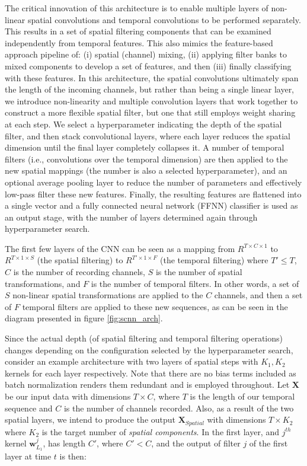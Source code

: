 \documentclass[fleqn,10pt]{wlscirep}
\begin{document}
The critical innovation of this architecture is to enable multiple layers of non-linear spatial convolutions and temporal convolutions to be performed separately. This results in a set of spatial filtering components that can be examined independently from temporal features. This also mimics the feature-based approach pipeline of: (i) spatial (channel) mixing, (ii) applying filter banks to mixed components to develop a set of features, and then (iii) finally classifying with these features. In this architecture, the spatial convolutions ultimately span the length of the incoming channels, but rather than being a single linear layer, we introduce non-linearity and multiple convolution layers that work together to construct a more flexible spatial filter, but one that still employs weight sharing at each step. We select a hyperparameter indicating the depth of the spatial filter, and then stack convolutional layers, where each layer reduces the spatial dimension until the final layer completely collapses it. A number of temporal filters (i.e., convolutions over the temporal dimension) are then applied to the new spatial mappings (the number is also a selected hyperparameter), and an optional average pooling layer to reduce the number of parameters and effectively low-pass filter these new features. Finally, the resulting features are flattened into a single vector and a fully connected neural network (FFNN) classifier is used as an output stage, with the number of layers determined again through hyperparameter search.

The first few layers of the CNN can be seen as a mapping from $R^{T \times C \times 1}$ to $R^{T \times 1 \times S}$ (the spatial filtering) to $R^{T' \times 1 \times F }$ (the temporal filtering) where $T' \leq T$, $C$ is the number of recording channels, $S$ is the number of spatial transformations, and $F$ is the number of temporal filters. In other words, a set of $S$ non-linear spatial transformations are applied to the $C$ channels, and then a set of $F$ temporal filters are applied to these new sequences, as can be seen in the diagram presented in figure \ref{fig:scnn_arch}.

Since the actual depth (of spatial filtering and temporal filtering operations) changes depending on the configuration selected by the hyperparameter search, consider an example architecture with two layers of spatial steps with $K_1, K_2$ kernels for each layer respectively. Note that there are no bias terms included as batch normalization \cite{Szegedy2015} renders them redundant and is employed throughout. Let $\boldsymbol{X}$ be our input data with dimensions $T \times C$, where $T$ is the length of our temporal sequence and $C$ is the number of channels recorded. Also, as a result of the two spatial layers, we intend to produce the output $\boldsymbol{X}_{Spatial}$ with dimensions $T \times K_2$ where $K_2$ is the target number of {\em spatial components}. In the first layer, and $j^{th}$ kernel $\boldsymbol{w}_{L_1}^j$, has length $C'$, where $C' < C$, and the output of filter $j$ of the first layer at time $t$ is then:
\end{document}
